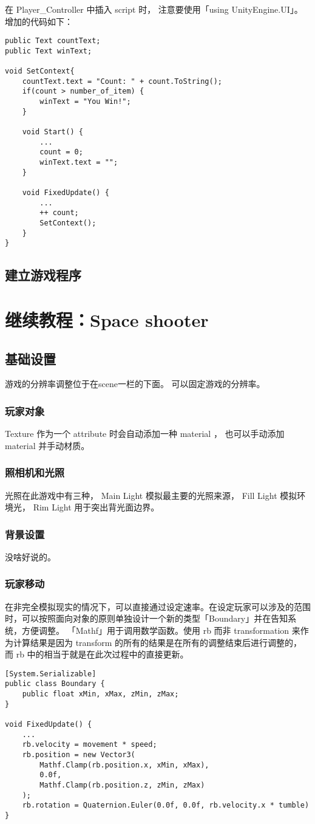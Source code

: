 \documentclass[10pt, a4paper]{article}
\begin{document}
            在 Player\_Controller 中插入 script 时， 注意要使用「using UnityEngine.UI」。增加的代码如下：

\begin{lstlisting}
public Text countText;
public Text winText;

void SetContext{
    countText.text = "Count: " + count.ToString();
    if(count > number_of_item) {
        winText = "You Win!";
    }

    void Start() {
        ...
        count = 0; 
        winText.text = "";
    }

    void FixedUpdate() {
        ...
        ++ count; 
        SetContext();
    }
}
\end{lstlisting}
        \subsection{建立游戏程序}
    
\newpage

    \section{继续教程：Space shooter}
        \subsection{基础设置}
            游戏的分辨率调整位于在scene一栏的下面。  可以固定游戏的分辨率。
        \subsubsection{玩家对象}
            Texture 作为一个 attribute 时会自动添加一种 material ， 也可以手动添加 material 并手动材质。
        \subsubsection{照相机和光照}
            光照在此游戏中有三种， Main Light 模拟最主要的光照来源， Fill Light 模拟环境光， Rim Light 用于突出背光面边界。
        \subsubsection{背景设置}
            没啥好说的。
        \subsubsection{玩家移动}
            在非完全模拟现实的情况下，可以直接通过设定速率。在设定玩家可以涉及的范围时，可以按照面向对象的原则单独设计一个新的类型「Boundary」并在告知系统，方便调整。 「Mathf」用于调用数学函数。使用 rb 而非 transformation 来作为计算结果是因为 transform 的所有的结果是在所有的调整结束后进行调整的， 而 rb 中的相当于就是在此次过程中的直接更新。
\begin{lstlisting} 
[System.Serializable]
public class Boundary {
    public float xMin, xMax, zMin, zMax;
}

void FixedUpdate() {
    ...
    rb.velocity = movement * speed; 
    rb.position = new Vector3(
        Mathf.Clamp(rb.position.x, xMin, xMax), 
        0.0f, 
        Mathf.Clamp(rb.position.z, zMin, zMax)
    );
    rb.rotation = Quaternion.Euler(0.0f, 0.0f, rb.velocity.x * tumble)
}
\end{lstlisting}
\end{document}
